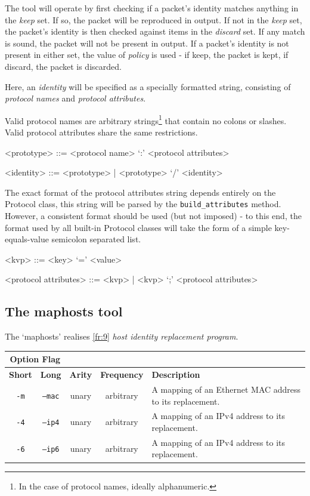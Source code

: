 \documentclass[10pt,a4paper,notitlepage,twoside]{report}
\begin{document}
The tool will operate by first checking if a packet's identity matches anything in the \emph{keep} set. If so, the packet will be reproduced in output. If not in the \emph{keep} set, the packet's identity is then checked against items in the \emph{discard} set. If any match is sound, the packet will not be present in output. If a packet's identity is not present in either set, the value of \emph{policy} is used - if keep, the packet is kept, if discard, the packet is discarded.

Here, an \emph{identity} will be specified as a specially formatted string, consisting of \emph{protocol names} and \emph{protocol attributes}.

Valid protocol names are arbitrary strings\footnote{In the case of protocol names, ideally alphanumeric.} that contain no colons or slashes. Valid protocol attributes share the same restrictions.

\begin{grammar}
<prototype> ::= <protocol name> `:' <protocol attributes>

<identity> ::= <prototype> | <prototype> `/' <identity>
\end{grammar}

The exact format of the protocol attributes string depends entirely on the Protocol class, this string will be parsed by the \texttt{build_attributes} method. However, a consistent format should be used (but not imposed) - to this end, the format used by all built-in Protocol classes will take the form of a simple key-equals-value semicolon separated list.

\begin{grammar}
<kvp> ::= <key> `=' <value>

<protocol attributes> ::= <kvp> | <kvp> `;' <protocol attributes>
\end{grammar}


\subsection{The maphosts tool}
The `maphosts' realises \ref{fr:9} \emph{host identity replacement program}.

\begin{tabularx}{\textwidth}{|c|c|c|c|X|}
\cline{1-2}
\multicolumn{2}{|c|}{\textbf{Option Flag}} & \multicolumn{3}{c}{}\\ \hline
\textbf{Short} & \textbf{Long} & \textbf{Arity} & \textbf{Frequency} & \textbf{Description} \\ \hline
\texttt{-m} & \texttt{--mac} & unary & arbitrary & A mapping of an Ethernet MAC address to its replacement.\\ \hline
\texttt{-4} & \texttt{--ip4} & unary & arbitrary & A mapping of an IPv4 address to its replacement.\\ \hline
\texttt{-6} & \texttt{--ip6} & unary & arbitrary & A mapping of an IPv4 address to its replacement.\\ \hline
\end{tabularx}
\end{document}
